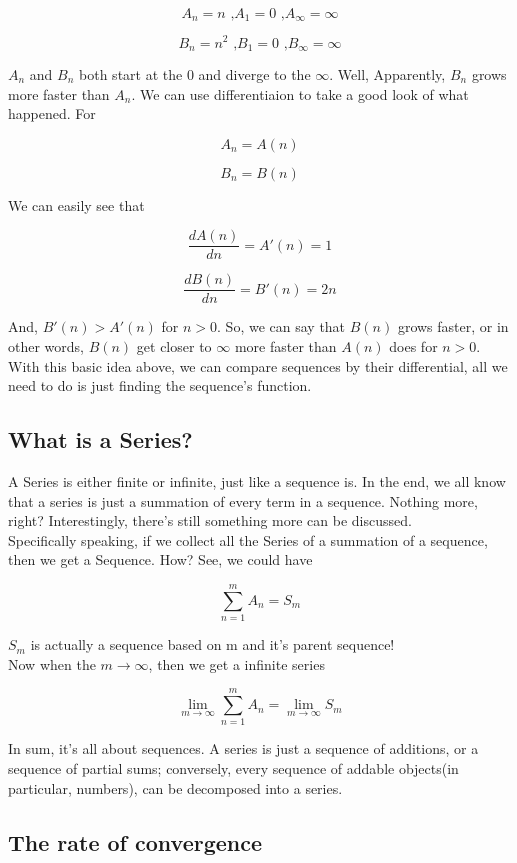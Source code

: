 \documentclass{article}
\begin{document}
  \[
	  A_n = n \text{ ,} A_1 = 0 \text{ ,} A_\infty = \infty
  \]

  \[
	  B_n = n^2 \text{ ,} B_1 = 0 \text{ ,} B_\infty = \infty
  \]

  $A_n$ and $B_n$ both start at the $0$ and diverge to the $\infty$. Well, Apparently, $B_n$ grows more faster than $A_n$. We can use differentiaion to take a good look of what happened. For

  \[
	  A_n = A(n)
  \]

  \[
	  B_n = B(n)
  \]

  We can easily see that 
  
  \[
	  \dfrac{dA(n)}{dn} = A'(n) = 1
  \]

  \[
	  \dfrac{dB(n)}{dn} = B'(n) = 2n
  \]

  And, $B'(n)>A'(n)$ for $n>0$. So, we can say that $B(n)$ grows faster, or in other words, $B(n)$ get closer to $\infty$ more faster than $A(n)$ does for $n>0$. \\

  With this basic idea above, we can compare sequences by their differential, all we need to do is just finding the sequence's function.

  \subsection{What is a Series?}
  A Series is either finite or infinite, just like a sequence is. In the end, we all know that a series is just a summation of every term in a sequence. Nothing more, right? Interestingly, there's still something more can be discussed. \\

  Specifically speaking, if we collect all the Series of a summation of a sequence, then we get a Sequence. How? See, we could have

  \[
	  \sum_{n=1}^{m} A_n = S_m
  \]

  $S_m$ is actually a sequence based on m and it's parent sequence! \\

  Now when the $m \to \infty$, then we get a infinite series

  \[
	  \lim_{m \to \infty} \sum_{n=1}^{m} A_n = \lim_{m \to \infty} S_m
  \]

  In sum, it's all about sequences. A series is just a sequence of additions, or a sequence of partial sums; conversely, every sequence of addable objects(in particular, numbers), can be decomposed into a series.

  \subsection{The rate of convergence}
\end{document}
